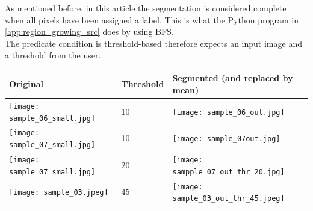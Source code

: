 \documentclass[a4paper]{article}
\begin{document}
\marginnote{\faCogs \ref{app:region_growing_src} \faCogs} As mentioned before, in this article the segmentation is considered complete when all pixels have been assigned a label. This is what the Python program in \ref{app:region_growing_src} does by using BFS. \\ The predicate condition is threshold-based therefore expects an input image and a threshold from the user.

\begin{minipage}{\linewidth}
 \label{tab:seed_region_growing_results} 
\begin{center}
\begin{tabular}{| m{} | m{} | m{} |}
\hline   
    \textbf{Original}  & \textbf{Threshold} & \textbf{Segmented (and replaced by mean)}  \\
\hline 
\hline
\texttt{[image: sample\_06\_small.jpg]}  &
10 &
\texttt{[image: sample\_06\_out.jpg]}\\
\hline
\texttt{[image: sample\_07\_small.jpg]}  &
10 &
\texttt{[image: sample\_07out.jpg]}\\
\hline
\texttt{[image: sample\_07\_small.jpg]}  &
20 &
\texttt{[image: sampple\_07\_out\_thr\_20.jpg]}\\
\hline
\texttt{[image: sample\_03.jpeg]}  &
45 &
\texttt{[image: sample\_03\_out\_thr\_45.jpeg]}\\
\hline

\hline
\end{tabular}
\end{center}
\end{minipage}
\end{document}
